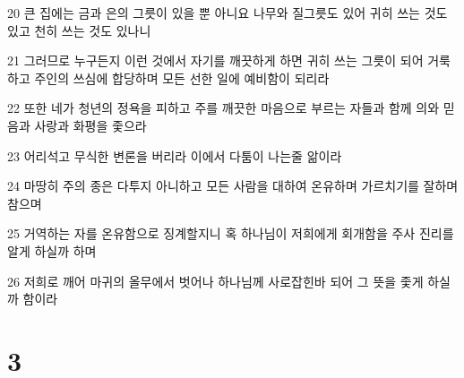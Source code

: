 \par 20 큰 집에는 금과 은의 그릇이 있을 뿐 아니요 나무와 질그릇도 있어 귀히 쓰는 것도 있고 천히 쓰는 것도 있나니
\par 21 그러므로 누구든지 이런 것에서 자기를 깨끗하게 하면 귀히 쓰는 그릇이 되어 거룩하고 주인의 쓰심에 합당하며 모든 선한 일에 예비함이 되리라
\par 22 또한 네가 청년의 정욕을 피하고 주를 깨끗한 마음으로 부르는 자들과 함께 의와 믿음과 사랑과 화평을 좇으라
\par 23 어리석고 무식한 변론을 버리라 이에서 다툼이 나는줄 앎이라
\par 24 마땅히 주의 종은 다투지 아니하고 모든 사람을 대하여 온유하며 가르치기를 잘하며 참으며
\par 25 거역하는 자를 온유함으로 징계할지니 혹 하나님이 저희에게 회개함을 주사 진리를 알게 하실까 하며
\par 26 저희로 깨어 마귀의 올무에서 벗어나 하나님께 사로잡힌바 되어 그 뜻을 좇게 하실까 함이라

\chapter{3}

